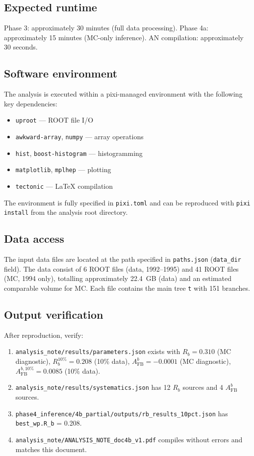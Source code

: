 \documentclass[11pt,a4paper]{article}
\begin{document}
\subsection{Expected runtime}

Phase 3: approximately 30 minutes (full data processing).
Phase 4a: approximately 15 minutes (MC-only inference).
AN compilation: approximately 30 seconds.

\subsection{Software environment}

The analysis is executed within a pixi-managed environment with the following key
dependencies:
\begin{itemize}
\item \texttt{uproot} --- ROOT file I/O
\item \texttt{awkward-array}, \texttt{numpy} --- array operations
\item \texttt{hist}, \texttt{boost-histogram} --- histogramming
\item \texttt{matplotlib}, \texttt{mplhep} --- plotting
\item \texttt{tectonic} --- LaTeX compilation
\end{itemize}

The environment is fully specified in \texttt{pixi.toml} and can be reproduced
with \texttt{pixi install} from the analysis root directory.

\subsection{Data access}

The input data files are located at the path specified in \texttt{paths.json}
(\texttt{data\_dir} field). The data consist of 6 ROOT files (data, 1992--1995)
and 41 ROOT files (MC, 1994 only), totalling approximately 22.4~GB (data) and
an estimated comparable volume for MC. Each file contains the main tree \texttt{t}
with 151 branches.

\subsection{Output verification}

After reproduction, verify:
\begin{enumerate}
\item \texttt{analysis\_note/results/parameters.json} exists with
$R_b = 0.310$ (MC diagnostic), $R_b^{10\%} = 0.208$ (10\% data),
$A_\mathrm{FB}^b = -0.0001$ (MC diagnostic), $A_\mathrm{FB}^{b,10\%} = 0.0085$ (10\% data).
\item \texttt{analysis\_note/results/systematics.json} has 12 $R_b$ sources
and 4 $A_\mathrm{FB}^b$ sources.
\item \texttt{phase4\_inference/4b\_partial/outputs/rb\_results\_10pct.json} has
\texttt{best\_wp.R\_b} = 0.208.
\item \texttt{analysis\_note/ANALYSIS\_NOTE\_doc4b\_v1.pdf} compiles without
errors and matches this document.
\end{enumerate}
\end{document}
